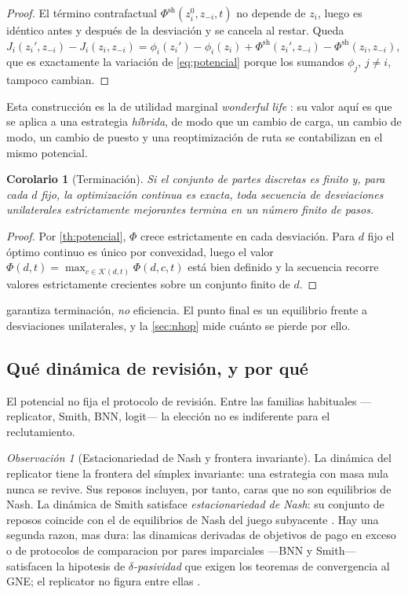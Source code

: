 \documentclass[11pt,a4paper]{article}
\theoremstyle{plain}
\newtheorem{corolario}[teorema]{Corolario}
\theoremstyle{definition}
\theoremstyle{remark}
\newtheorem{observacion}[teorema]{Observación}
\newcommand{\Kcal}{\mathcal{K}}
\begin{document}
\begin{proof}
El término contrafactual $\Phi^{\mathrm{sh}}(z_i^{0},z_{-i},t)$ no depende de
$z_i$, luego es idéntico antes y después de la desviación y se cancela al
restar. Queda
$J_i(z_i',z_{-i})-J_i(z_i,z_{-i})
=\phi_i(z_i')-\phi_i(z_i)+\Phi^{\mathrm{sh}}(z_i',z_{-i})-\Phi^{\mathrm{sh}}(z_i,z_{-i})$,
que es exactamente la variación de \eqref{eq:potencial} porque los sumandos
$\phi_j$, $j\ne i$, tampoco cambian.
\end{proof}

Esta construcción es la de utilidad marginal \emph{wonderful life}
\cite{wolpert1999collective,marden2009cooperative}: su valor aquí es que se
aplica a una estrategia \emph{híbrida}, de modo que un cambio de carga, un
cambio de modo, un cambio de puesto y una reoptimización de ruta se contabilizan
en el mismo potencial.

\begin{corolario}[Terminación]
\label{co:terminacion}
Si el conjunto de partes discretas es finito y, para cada $d$ fijo, la
optimización continua es exacta, toda secuencia de desviaciones unilaterales
estrictamente mejorantes termina en un número finito de pasos.
\end{corolario}

\begin{proof}
Por \cref{th:potencial}, $\Phi$ crece estrictamente en cada desviación. Para $d$
fijo el óptimo continuo es único por convexidad, luego el valor
$\Phi(d,t)=\max_{c\in\Kcal(d,t)}\Phi(d,c,t)$ está bien definido y la secuencia
recorre valores estrictamente crecientes sobre un conjunto finito de $d$.
\end{proof}

 garantiza terminación, \emph{no} eficiencia. El punto
final es un equilibrio frente a desviaciones unilaterales, y la
\cref{sec:nhop} mide cuánto se pierde por ello.

\subsection{Qué dinámica de revisión, y por qué}

El potencial no fija el protocolo de revisión. Entre las familias habituales
—replicator, Smith, BNN, logit— la elección no es indiferente para el
reclutamiento.

\begin{observacion}[Estacionariedad de Nash y frontera invariante]
\label{obs:smith}
La dinámica del replicator tiene la frontera del símplex invariante: una
estrategia con masa nula nunca se revive. Sus reposos incluyen, por tanto,
caras que no son equilibrios de Nash. La dinámica de Smith satisface
\emph{estacionariedad de Nash}: su conjunto de reposos coincide con el de
equilibrios de Nash del juego subyacente \cite{quijano2017role,sandholm2010population}.
Hay una segunda razon, mas dura: las dinamicas derivadas de objetivos de pago
en exceso o de protocolos de comparacion por pares imparciales ---BNN y Smith---
satisfacen la hipotesis de \emph{$\delta$-pasividad} que exigen los teoremas de
convergencia al GNE; el replicator no figura entre ellas
\cite{arcak2021dissipativity,martinezPiazuelo2025gne}.
\end{observacion}
\end{document}
